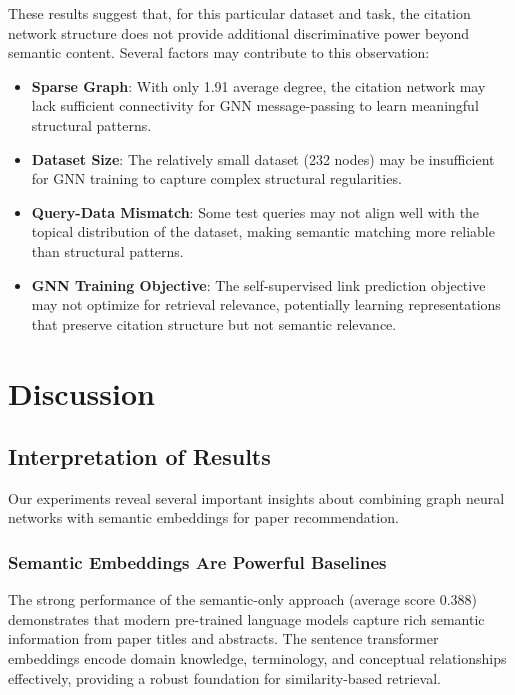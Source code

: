 \documentclass[pdflatex,sn-mathphys-num]{sn-jnl}
\theoremstyle{thmstyleone}%
\theoremstyle{thmstyletwo}%
\theoremstyle{thmstylethree}%
\begin{document}
These results suggest that, for this particular dataset and task, the citation network structure does not provide additional discriminative power beyond semantic content. Several factors may contribute to this observation:

\begin{itemize}
    \item \textbf{Sparse Graph}: With only 1.91 average degree, the citation network may lack sufficient connectivity for GNN message-passing to learn meaningful structural patterns.

    \item \textbf{Dataset Size}: The relatively small dataset (232 nodes) may be insufficient for GNN training to capture complex structural regularities.

    \item \textbf{Query-Data Mismatch}: Some test queries may not align well with the topical distribution of the dataset, making semantic matching more reliable than structural patterns.

    \item \textbf{GNN Training Objective}: The self-supervised link prediction objective may not optimize for retrieval relevance, potentially learning representations that preserve citation structure but not semantic relevance.
\end{itemize}

\section{Discussion}\label{sec:discussion}

\subsection{Interpretation of Results}

Our experiments reveal several important insights about combining graph neural networks with semantic embeddings for paper recommendation.

\subsubsection{Semantic Embeddings Are Powerful Baselines}

The strong performance of the semantic-only approach (average score 0.388) demonstrates that modern pre-trained language models capture rich semantic information from paper titles and abstracts. The sentence transformer embeddings encode domain knowledge, terminology, and conceptual relationships effectively, providing a robust foundation for similarity-based retrieval.
\end{document}
